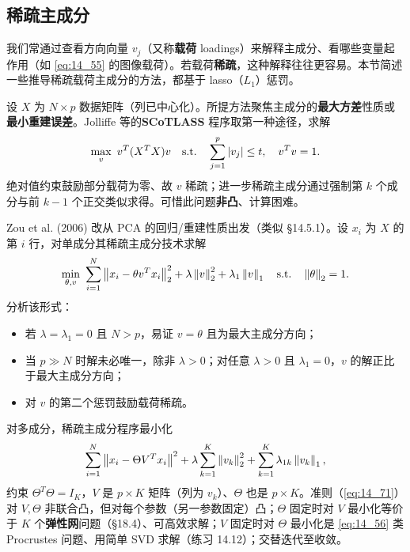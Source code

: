 \subsection{稀疏主成分}

我们常通过查看方向向量 $v_j$（又称\textbf{载荷} loadings）来解释主成分、看哪些变量起作用（如 \eqref{eq:14_55} 的图像载荷）。若载荷\textbf{稀疏}，这种解释往往更容易。本节简述一些推导稀疏载荷主成分的方法，都基于 lasso（$L_1$）惩罚。

设 $X$ 为 $N\times p$ 数据矩阵（列已中心化）。所提方法聚焦主成分的\textbf{最大方差}性质或\textbf{最小重建误差}。Jolliffe 等的\textbf{SCoTLASS} 程序取第一种途径，求解
\begin{equation}
\max_v\ v^T(X^TX)v \quad \text{s.t.}\quad \sum_{j=1}^{p}\left\lvert v_j\right\rvert\le t,\quad v^Tv=1. \label{eq:14_69}
\end{equation}
绝对值约束鼓励部分载荷为零、故 $v$ 稀疏；进一步稀疏主成分通过强制第 $k$ 个成分与前 $k-1$ 个正交类似求得。可惜此问题\textbf{非凸}、计算困难。

Zou et al. (2006) 改从 PCA 的回归/重建性质出发（类似 §14.5.1）。设 $x_i$ 为 $X$ 的第 $i$ 行，对单成分其稀疏主成分技术求解
\begin{equation}
\min_{\theta,v}\ \sum_{i=1}^{N}\left\lVert x_i - \theta v^T x_i\right\rVert_2^2 + \lambda\left\lVert v\right\rVert_2^2 + \lambda_1\left\lVert v\right\rVert_1 \quad \text{s.t.}\quad \left\lVert\theta\right\rVert_2=1. \label{eq:14_70}
\end{equation}
分析该形式：
\begin{itemize}[itemsep=1pt]
\item 若 $\lambda=\lambda_1=0$ 且 $N>p$，易证 $v=\theta$ 且为最大主成分方向；
\item 当 $p\gg N$ 时解未必唯一，除非 $\lambda>0$；对任意 $\lambda>0$ 且 $\lambda_1=0$，$v$ 的解正比于最大主成分方向；
\item 对 $v$ 的第二个惩罚鼓励载荷稀疏。
\end{itemize}
对多成分，稀疏主成分程序最小化
\begin{equation}
\sum_{i=1}^{N}\left\lVert x_i - \Theta V^T x_i\right\rVert^2 + \lambda\sum_{k=1}^{K}\left\lVert v_k\right\rVert_2^2 + \sum_{k=1}^{K}\lambda_{1k}\left\lVert v_k\right\rVert_1, \label{eq:14_71}
\end{equation}
约束 $\Theta^T\Theta=I_K$，$V$ 是 $p\times K$ 矩阵（列为 $v_k$）、$\Theta$ 也是 $p\times K$。准则（\eqref{eq:14_71}）对 $V,\Theta$ 非联合凸，但对每个参数（另一参数固定）凸；$\Theta$ 固定时对 $V$ 最小化等价于 $K$ 个\textbf{弹性网}问题（§18.4）、可高效求解；$V$ 固定时对 $\Theta$ 最小化是 \eqref{eq:14_56} 类 Procrustes 问题、用简单 SVD 求解（练习 14.12）；交替迭代至收敛。

